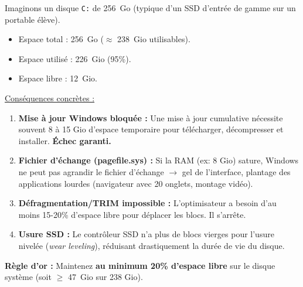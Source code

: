 \documentclass[11pt]{article}
\begin{document}
\begin{exemplebox}
Imaginons un disque \texttt{C:} de \SI{256}{Go} (typique d'un SSD d'entrée de gamme sur un portable élève).
\begin{itemize}
    \item Espace total : \SI{256}{Go} ($\approx$ \SI{238}{Gio} utilisables).
    \item Espace utilisé : \SI{226}{Gio} (95\%).
    \item Espace libre : \SI{12}{Gio}.
\end{itemize}
\underline{Conséquences concrètes :}
\begin{enumerate}
    \item \textbf{Mise à jour Windows bloquée :} Une mise à jour cumulative nécessite souvent 8 à 15 Gio d'espace temporaire pour télécharger, décompresser et installer. \textbf{Échec garanti.}
    \item \textbf{Fichier d'échange (pagefile.sys) :} Si la RAM (ex: 8 Gio) sature, Windows ne peut pas agrandir le fichier d'échange $\rightarrow$ gel de l'interface, plantage des applications lourdes (navigateur avec 20 onglets, montage vidéo).
    \item \textbf{Défragmentation/TRIM impossible :} L'optimisateur a besoin d'au moins 15-20\% d'espace libre pour déplacer les blocs. Il s'arrête.
    \item \textbf{Usure SSD :} Le contrôleur SSD n'a plus de blocs vierges pour l'usure nivelée (\emph{wear leveling}), réduisant drastiquement la durée de vie du disque.
\end{enumerate}
\textbf{Règle d'or :} Maintenez \textbf{au minimum 20\% d'espace libre} sur le disque système (soit $\ge$ \SI{47}{Gio} sur 238 Gio).
\end{exemplebox}
\end{document}
